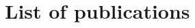 \documentclass[
	10pt, %
	fleqn, %
	a4paper, %
]{LegrandOrangeBook}
\begin{document}










\pagestyle{empty} %

\tableofcontents %



\pagestyle{fancy} %

\cleardoublepage %


\chapterimage{} %
\chapterspaceabove{6.75cm} %
\chapterspacebelow{7.25cm} %

\chapter*{List of publications}
\end{document}
